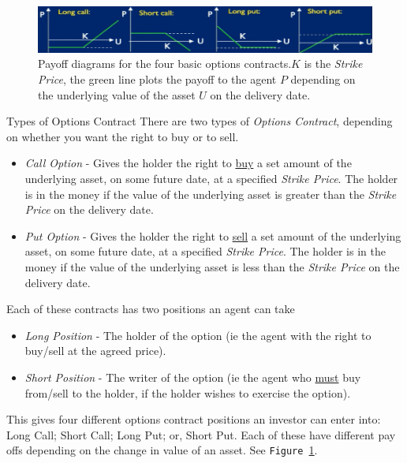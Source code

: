 \documentclass[11pt,a4paper]{article}
\begin{document}
  \begin{figure}[ht!]
    \centering
    \includegraphics[width=.9\textwidth]{options.PNG}
    \caption{Payoff diagrams for the four basic options contracts.{\tiny $K$ is the \textit{Strike Price}, the green line plots the payoff to the agent $P$ depending on the underlying value of the asset $U$ on the delivery date.}}
    \label{fig_OptionsPayoff}
  \end{figure}

  \begin{proposition}{Types of Options Contract}
    There are two types of \textit{Options Contract}, depending on whether you want the right to buy or to sell.
    \begin{itemize}
      \item \textit{Call Option} - Gives the holder the right to \underline{buy} a set amount of the underlying asset, on some future date, at a specified \textit{Strike Price}. The holder is in the money if the value of the underlying asset is greater than the \textit{Strike Price} on the delivery date.
      \item \textit{Put Option} - Gives the holder the right to \underline{sell} a set amount of the underlying asset, on some future date, at a specified \textit{Strike Price}. The holder is in the money if the value of the underlying asset is less than the \textit{Strike Price} on the delivery date.
    \end{itemize}
    Each of these contracts has two positions an agent can take
    \begin{itemize}
      \item \textit{Long Position} - The holder of the option (ie the agent with the right to buy/sell at the agreed price).
      \item \textit{Short Position} - The writer of the option (ie the agent who \underline{must} buy from/sell to the holder, if the holder wishes to exercise the option).
    \end{itemize}
    This gives four different options contract positions an investor can enter into: Long Call; Short Call; Long Put; or, Short Put. Each of these have different pay offs depending on the change in value of an asset. See \texttt{Figure \ref{fig_OptionsPayoff}}.
  \end{proposition}
\end{document}
